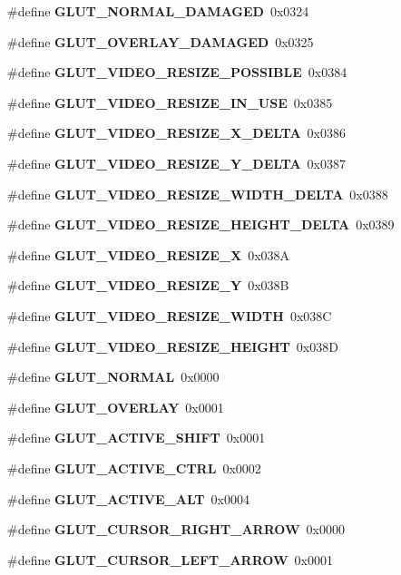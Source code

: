 \begin{DoxyCompactItemize}
\item 
\#define {\bf G\+L\+U\+T\+\_\+\+N\+O\+R\+M\+A\+L\+\_\+\+D\+A\+M\+A\+G\+E\+D}~0x0324
\item 
\#define {\bf G\+L\+U\+T\+\_\+\+O\+V\+E\+R\+L\+A\+Y\+\_\+\+D\+A\+M\+A\+G\+E\+D}~0x0325
\item 
\#define {\bf G\+L\+U\+T\+\_\+\+V\+I\+D\+E\+O\+\_\+\+R\+E\+S\+I\+Z\+E\+\_\+\+P\+O\+S\+S\+I\+B\+L\+E}~0x0384
\item 
\#define {\bf G\+L\+U\+T\+\_\+\+V\+I\+D\+E\+O\+\_\+\+R\+E\+S\+I\+Z\+E\+\_\+\+I\+N\+\_\+\+U\+S\+E}~0x0385
\item 
\#define {\bf G\+L\+U\+T\+\_\+\+V\+I\+D\+E\+O\+\_\+\+R\+E\+S\+I\+Z\+E\+\_\+\+X\+\_\+\+D\+E\+L\+T\+A}~0x0386
\item 
\#define {\bf G\+L\+U\+T\+\_\+\+V\+I\+D\+E\+O\+\_\+\+R\+E\+S\+I\+Z\+E\+\_\+\+Y\+\_\+\+D\+E\+L\+T\+A}~0x0387
\item 
\#define {\bf G\+L\+U\+T\+\_\+\+V\+I\+D\+E\+O\+\_\+\+R\+E\+S\+I\+Z\+E\+\_\+\+W\+I\+D\+T\+H\+\_\+\+D\+E\+L\+T\+A}~0x0388
\item 
\#define {\bf G\+L\+U\+T\+\_\+\+V\+I\+D\+E\+O\+\_\+\+R\+E\+S\+I\+Z\+E\+\_\+\+H\+E\+I\+G\+H\+T\+\_\+\+D\+E\+L\+T\+A}~0x0389
\item 
\#define {\bf G\+L\+U\+T\+\_\+\+V\+I\+D\+E\+O\+\_\+\+R\+E\+S\+I\+Z\+E\+\_\+\+X}~0x038\+A
\item 
\#define {\bf G\+L\+U\+T\+\_\+\+V\+I\+D\+E\+O\+\_\+\+R\+E\+S\+I\+Z\+E\+\_\+\+Y}~0x038\+B
\item 
\#define {\bf G\+L\+U\+T\+\_\+\+V\+I\+D\+E\+O\+\_\+\+R\+E\+S\+I\+Z\+E\+\_\+\+W\+I\+D\+T\+H}~0x038\+C
\item 
\#define {\bf G\+L\+U\+T\+\_\+\+V\+I\+D\+E\+O\+\_\+\+R\+E\+S\+I\+Z\+E\+\_\+\+H\+E\+I\+G\+H\+T}~0x038\+D
\item 
\#define {\bf G\+L\+U\+T\+\_\+\+N\+O\+R\+M\+A\+L}~0x0000
\item 
\#define {\bf G\+L\+U\+T\+\_\+\+O\+V\+E\+R\+L\+A\+Y}~0x0001
\item 
\#define {\bf G\+L\+U\+T\+\_\+\+A\+C\+T\+I\+V\+E\+\_\+\+S\+H\+I\+F\+T}~0x0001
\item 
\#define {\bf G\+L\+U\+T\+\_\+\+A\+C\+T\+I\+V\+E\+\_\+\+C\+T\+R\+L}~0x0002
\item 
\#define {\bf G\+L\+U\+T\+\_\+\+A\+C\+T\+I\+V\+E\+\_\+\+A\+L\+T}~0x0004
\item 
\#define {\bf G\+L\+U\+T\+\_\+\+C\+U\+R\+S\+O\+R\+\_\+\+R\+I\+G\+H\+T\+\_\+\+A\+R\+R\+O\+W}~0x0000
\item 
\#define {\bf G\+L\+U\+T\+\_\+\+C\+U\+R\+S\+O\+R\+\_\+\+L\+E\+F\+T\+\_\+\+A\+R\+R\+O\+W}~0x0001

\end{DoxyCompactItemize}
